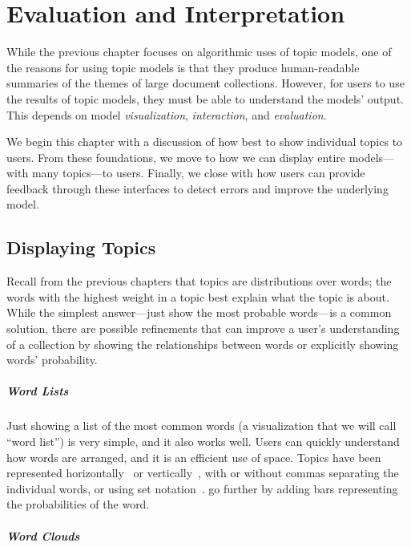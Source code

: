 \chapter{Evaluation and Interpretation}
\label{ch:viz}

While the previous chapter focuses on algorithmic uses of topic
models, one of the reasons for using topic models is that they produce
human-readable summaries of the themes of large document collections.  However,
for users to use the results of topic models, they must be able to understand
the models' output.  This depends on model \emph{visualization},
\emph{interaction}, and \emph{evaluation}.

We begin this chapter with a discussion of how best to show individual
topics to users.  From these foundations, we move to how we can
display entire models---with many topics---to users.  Finally, we
close with how users can provide feedback through these interfaces to
detect errors and improve the underlying model.

\section{Displaying Topics}
\label{sec:display}

Recall from the previous chapters that topics are distributions over words; the
words with the highest weight in a topic best explain what the topic is about.
While the simplest answer---just show the most probable words---is a common
solution, there are possible refinements that can improve a user's understanding
of a collection by showing the relationships between words or explicitly showing
words' probability.

\paragraph{Word Lists}

Just showing a list of the most common words (a
visualization that we will call ``word list'') is very simple, and it also works well.
Users can quickly understand how words are arranged, and it is an efficient use of
space. 
Topics have been represented horizontally~\citep{gardner-10,smith2015visual} or
vertically~\citep{eisenstein2012topicviz,chaney-12}, with or without
commas separating the individual words, or using set
notation~\citep{chaney-12}.  \citet{smith2015visual} go further by
adding bars representing the probabilities of the word.

\paragraph{Word Clouds}

